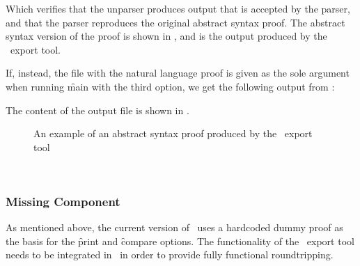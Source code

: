 \documentclass[BA.tex]{subfiles}
\begin{document}
 Which verifies that the unparser produces output that is accepted by the
 parser, and that the parser reproduces the original abstract syntax proof.
 The abstract syntax version of the proof is shown in , and
 is the output produced by the \bp\ export tool.

 If, instead, the file with the natural language proof is given as the
 sole argument when running \f{main} with the third option, we get the
 following  output from \tool :

 The content of the output file is shown in .

\begin{figure}[!ht]

\caption[]{An example of an abstract syntax proof produced by the \bp\
export tool}
\label{bpexport}
\end{figure}

\begin{figure}[!ht]
~~
\begin{subfigure}[t]{0.95\textwidth}
\small

\end{subfigure}
\caption[]{}
\label{bpinput}
\end{figure}

\subsubsection{Missing Component}
 As mentioned above, the current version of \tool\ uses a hardcoded
 dummy proof as the basis for the \f{print} and \f{compare} options.
 The functionality of the \bp\ export tool needs to be integrated in
 \tool\ in order to provide fully functional roundtripping.
\end{document}
